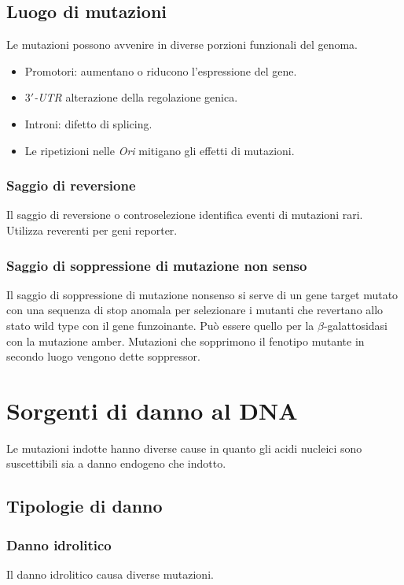 	\subsection{Luogo di mutazioni}
	Le mutazioni possono avvenire in diverse porzioni funzionali del genoma.
	\begin{multicols}{2}
		\begin{itemize}
			\item Promotori: aumentano o riducono l'espressione del gene.
			\item \emph{$3'$-UTR} alterazione della regolazione genica.
			\item Introni: difetto di splicing.
			\item Le ripetizioni nelle \emph{Ori} mitigano gli effetti di mutazioni.
		\end{itemize}
	\end{multicols}

	\subsubsection{Saggio di reversione}
	Il saggio di reversione o controselezione identifica eventi di mutazioni rari.
	Utilizza reverenti per geni reporter.

	\subsubsection{Saggio di soppressione di mutazione non senso}
	Il saggio di soppressione di mutazione nonsenso si serve di un gene target mutato con una sequenza di stop anomala per selezionare i mutanti che revertano allo stato wild type con il gene funzoinante.
	Pu\`o essere quello per la $\beta$-galattosidasi con la mutazione amber.
	Mutazioni che sopprimono il fenotipo mutante in secondo luogo vengono dette soppressor.

\section{Sorgenti di danno al DNA}
Le mutazioni indotte hanno diverse cause in quanto gli acidi nucleici sono suscettibili sia a danno endogeno che indotto.

	\subsection{Tipologie di danno}

		\subsubsection{Danno idrolitico}
		Il danno idrolitico causa diverse mutazioni.

